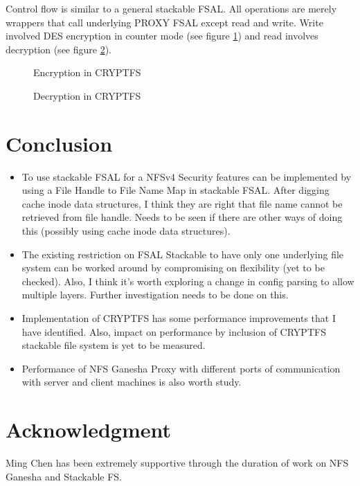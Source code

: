\documentclass[10pt, journal, twocolumn, twoside]{IEEEtran}
\begin{document}
Control flow is similar to a general stackable FSAL. All operations are merely wrappers that call underlying PROXY FSAL
except read and write. Write involved DES encryption in counter mode (see figure \ref{fsalCryptEncrypt}) and read involves
decryption (see figure \ref{fsalCryptDecrypt}).

\begin{figure}[!btp]
  \centering
  \caption{Encryption in CRYPTFS}
  \label{fsalCryptEncrypt}
\end{figure}

\begin{figure}[!btp]
  \centering
  \caption{Decryption in CRYPTFS}
  \label{fsalCryptDecrypt}
\end{figure}

\section{Conclusion}
\begin{itemize}
\item To use stackable FSAL for a NFSv4 Security features can be implemented by using a File Handle to
File Name Map in stackable FSAL. After digging cache inode data structures, I think they are right
that file name cannot be retrieved from file handle. Needs to be seen if there are other ways of
doing this (possibly using cache inode data structures).
\item The existing restriction on FSAL Stackable to have only one underlying file system can be
worked around by compromising on flexibility (yet to be checked). Also, I think it's worth
exploring a change in config parsing to allow multiple layers. Further investigation needs to be
done on this.
\item Implementation of CRYPTFS has some performance improvements that I have identified. Also,
impact on performance by inclusion of CRYPTFS stackable file system is yet to be
measured.
\item Performance of NFS Ganesha Proxy with different ports of communication with server and client machines
is also worth study.
\end{itemize}

\section*{Acknowledgment}
Ming Chen has been extremely supportive through the duration of work on NFS Ganesha and Stackable FS.



\end{document}
